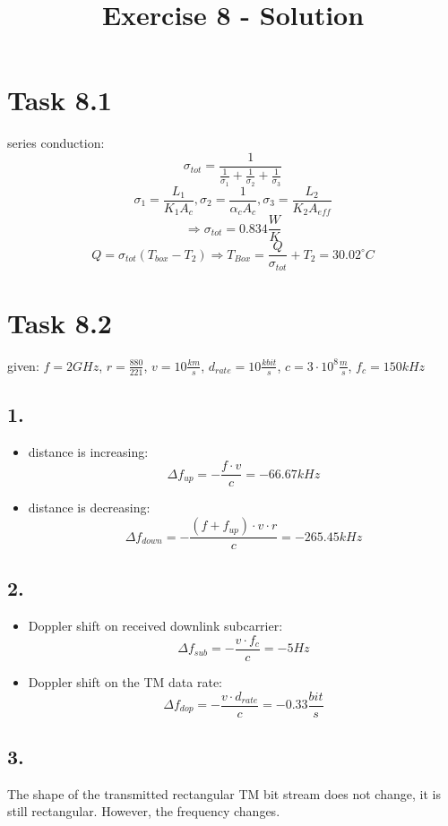 \documentclass[a4paper,12pt]{article}
\title{Exercise 8 - Solution}
\author{}
\date{}
\begin{document}
\maketitle

\section*{Task 8.1}
series conduction: \[\sigma_{tot} = \frac{1}{\frac{1}{\sigma_1}+\frac{1}{\sigma_2} + \frac{1}{\sigma_3}}\]
\[\sigma_1 = \frac{L_1}{K_1A_c}, \sigma_2 = \frac{1}{\alpha_cA_c}, \sigma_3 = \frac{L_2}{K_2A_{eff}}\]
\[\Rightarrow \sigma_{tot} = 0.834 \frac{W}{K}\]
\[Q = \sigma_{tot}(T_{box}-T_2) \Rightarrow T_{Box} = \frac{Q}{\sigma_{tot}}+T_2 = 30.02^{\circ}C\]

\section*{Task 8.2}
given: $f=2GHz$, $r=\frac{880}{221}$, $v=10\frac{km}{s}$, $d_{rate}=10\frac{kbit}{s}$, $c=3\cdot 10^8\frac{m}{s}$, $f_c=150kHz$ 

\subsection*{1.}
\begin{itemize}
 \item distance is increasing: 
 \[ \Delta f_{up} = -\frac{f \cdot v}{c} = -66.67kHz\]
 \item distance is decreasing: 
 \[\Delta f_{down} = -\frac{(f+f_{up}) \cdot v \cdot r}{c} = -265.45kHz\]
\end{itemize}

\subsection*{2.}
\begin{itemize}
 \item Doppler shift on received downlink subcarrier:
 \[\Delta f_{sub} = -\frac{v\cdot f_c}{c} = -5Hz\]
 \item Doppler shift on the TM data rate:
 \[\Delta f_{dop} = -\frac{v \cdot d_{rate}}{c} = -0.33\frac{bit}{s}\]
\end{itemize}

\subsection*{3.}
The shape of the transmitted rectangular TM bit stream does not change, it is still rectangular. However, the frequency changes. 
\end{document}
